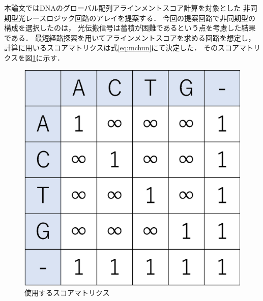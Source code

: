 本論文ではDNAのグローバル配列アラインメントスコア計算を対象とした
非同期型光レースロジック回路のアレイを提案する．
今回の提案回路で非同期型の構成を選択したのは，
光伝搬信号は蓄積が困難であるという点を考慮した結果である．
最短経路探索を用いてアラインメントスコアを求める回路を想定し，
計算に用いるスコアマトリクスは式\ref{eq:mchun}にて決定した．
そのスコアマトリクスを図\ref{fig:scorematrix_3}に示す．
\begin{figure}[t!]
\begin{center}
\includegraphics[keepaspectratio,scale=0.4]{fig/3/scorematrix.eps}
\caption{使用するスコアマトリクス}
\label{fig:scorematrix_3}
\end{center}
\end{figure}

